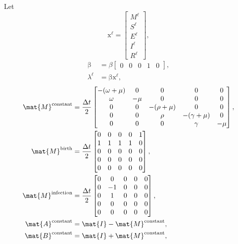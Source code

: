 \documentclass{jpmarticle}
\renewcommand{\vec}[1]{\boldsymbol{\mathrm{#1}}}
\begin{document}
Let
\begin{equation}
  \vec{x}^{\ell} =
  \begin{bmatrix}
    M^{\ell} \\ S^{\ell} \\ E^{\ell} \\ I^{\ell} \\ R^{\ell}
  \end{bmatrix},
\end{equation}
\begin{equation}
  \begin{split}
    \vec{\beta} &=
    \beta
    \begin{bmatrix}
      0 & 0 & 0 & 1 & 0
    \end{bmatrix},
    \\
    \lambda^{\ell} &=
    \vec{\beta} \vec{x}^{\ell},
  \end{split}
\end{equation}
\begin{equation}
  \begin{split}
    \mat{M}^{\text{constant}} &=
    \frac{\Delta t}{2}
    \begin{bmatrix}
      - (\omega + \mu) & 0 & 0 & 0 & 0
      \\
      \omega & - \mu & 0 & 0 & 0
      \\
      0 & 0 & - (\rho + \mu) & 0 & 0 \\
      0 & 0 & \rho & - (\gamma + \mu) & 0
      \\
      0 & 0 & 0 & \gamma & - \mu
    \end{bmatrix},
    \\
    \mat{M}^{\text{birth}} &=
    \frac{\Delta t}{2}
    \begin{bmatrix}
      0 & 0 & 0 & 0 & 1
      \\
      1 & 1 & 1 & 1 & 0
      \\
      0 & 0 & 0 & 0 & 0
      \\
      0 & 0 & 0 & 0 & 0
      \\
      0 & 0 & 0 & 0 & 0
    \end{bmatrix},
    \\
    \mat{M}^{\text{infection}} &=
    \frac{\Delta t}{2}
    \begin{bmatrix}
      0 & 0 & 0 & 0 & 0
      \\
      0 & - 1 & 0 & 0 & 0
      \\
      0 & 1 & 0 & 0 & 0
      \\
      0 & 0 & 0 & 0 & 0
      \\
      0 & 0 & 0 & 0 & 0
    \end{bmatrix},
    \\
    \mat{A}^{\text{constant}} &=
    \mat{I}
    - \mat{M}^{\text{constant}},
    \\
    \mat{B}^{\text{constant}} &=
    \mat{I}
    + \mat{M}^{\text{constant}},
  \end{split}
\end{equation}
\end{document}
